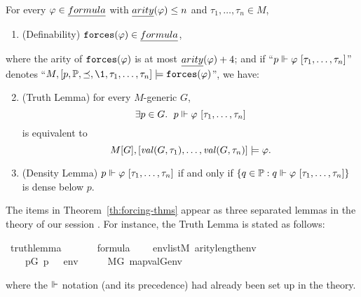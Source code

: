 \begin{theorem}\label{th:forcing-thms}
  For every
  $\phi\in\formula$ with $\isa{arity}(\phi)\leq n$ and $\tau_1,\dots,\tau_n\in M$,
  \begin{enumerate}
  \item\label{item:definability} (Definability)
    $\forceisa(\phi)\in\formula$, 
  \end{enumerate}
  where the 
  arity of $\mathop{\mathtt{forces}}(\varphi)$ is at most $\isa{arity}(\phi) + 4$; and if
  “$p \forces \phi\ [\tau_1,\dots,\tau_n]$”
  denotes
  “$M, [p,\PP,\preceq,\1, \tau_1,\dots,\tau_n]  \models
  \forceisa(\phi)$”, we have:
  \begin{enumerate}
    \setcounter{enumi}{1}
  \item\label{item:truth-lemma} (Truth Lemma) for every $M$-generic $G$,
    \[
      \exists p\in G.\ \; p \forces \phi\ [\tau_1,\dots,\tau_n]
    \]
    is equivalent to 
    \[
      M[G], [\operatorname{\mathit{val}}(G,\tau_1),\dots,\operatorname{\mathit{val}}(G,\tau_n)]
      \models \varphi.
    \]
  \item \label{item:density-lemma} (Density Lemma) $p \forces \phi\ [\tau_1,\dots,\tau_n]$
    if and only if 
    $\{q\in \PP :  q \forces \phi\ [\tau_1,\dots,\tau_n]\}$
    is dense below $p$.
  \end{enumerate}
\end{theorem}
The items in Theorem~\ref{th:forcing-thms} appear as three
separated lemmas in the theory
 of our
 session \cite{Independence_CH-AFP}.
For instance, the Truth Lemma is stated as
follows:
\begin{isabelle}
\isamarkupfalse%
\ truth{\isacharunderscore}{\kern0pt}lemma{\isacharcolon}{\kern0pt}\isanewline
\ \ \isanewline
\ \ \ \ {\isachardoublequoteopen}{\isasymphi}{\isasymin}formula{\isachardoublequoteclose}\isanewline
\ \ \ \ {\isachardoublequoteopen}env{\isasymin}list{\isacharparenleft}{\kern0pt}M{\isacharparenright}{\kern0pt}{\isachardoublequoteclose}\ {\isachardoublequoteopen}arity{\isacharparenleft}{\kern0pt}{\isasymphi}{\isacharparenright}{\kern0pt}{\isasymle}length{\isacharparenleft}{\kern0pt}env{\isacharparenright}{\kern0pt}{\isachardoublequoteclose}\isanewline
\ \ \isanewline
\ \ \ \ {\isachardoublequoteopen}{\isacharparenleft}{\kern0pt}{\isasymexists}p{\isasymin}G{\isachardot}{\kern0pt}\ p\ {\isasymtturnstile}\ {\isasymphi}\ env{\isacharparenright}{\kern0pt}\ \ \ {\isasymlongleftrightarrow}\ \ \ M{\isacharbrackleft}{\kern0pt}G{\isacharbrackright}{\kern0pt}{\isacharcomma}{\kern0pt}\ map{\isacharparenleft}{\kern0pt}val{\isacharparenleft}{\kern0pt}G{\isacharparenright}{\kern0pt}{\isacharcomma}{\kern0pt}env{\isacharparenright}{\kern0pt}\ {\isasymTurnstile}\ {\isasymphi}{\isachardoublequoteclose}
\end{isabelle}
where the $\Vdash$ notation (and its precedence) had already been set up in the
 theory.

